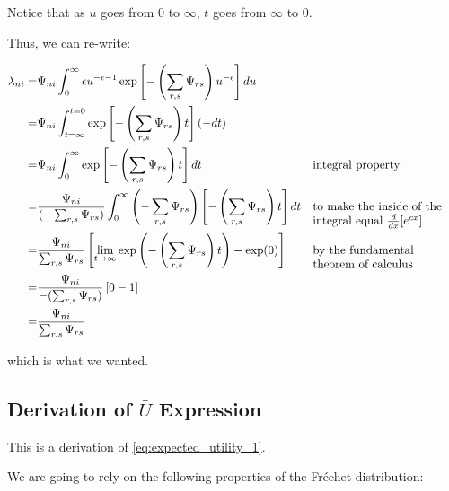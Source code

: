 \documentclass[10pt]{article}
\begin{document}
Notice that as $u$ goes from 0 to $\infty$, $t$ goes from $\infty$ to 0.

Thus, we can re-write:

\begin{align}
    \lambda_{ni} = &\Psi_{n i} \int_0^{\infty} \epsilon u^{-\epsilon-1} \exp \left[-\left(\sum_{r, s} \Psi_{r s}\right) u^{-\epsilon}\right] d u \\
    = &\Psi_{n i} \int_{t=\infty}^{t=0} \exp \left[- \left(\sum_{r, s} \Psi_{r s}\right) t\right](-d t)  \\
    = & \Psi_{n i} \int_{0}^{\infty} \exp \left[- \left(\sum_{r, s} \Psi_{r s}\right) t\right] d t && \parbox[t]{4cm}{\raggedright integral property} \\
    = & \frac{\Psi_{n i}}{(-\sum_{r, s} \Psi_{r s})} \int_{0}^\infty \left(-\sum_{r, s} \Psi_{r s}\right) \left[-\left(\sum_{r, s} \Psi_{r s}\right) t\right] d t && \parbox[t]{4cm}{\raggedright to make the inside of the integral equal $\frac{d}{dx}[e^{cx}]$} \\
    = & \frac{\Psi_{n i}}{\sum_{r, s} \Psi_{r s}} \left[ \lim_{t \to \infty} \exp\left(-\left(\sum_{r, s} \Psi_{r s}\right) t\right) - \exp(0)\right] && \parbox[t]{4cm}{\raggedright by the fundamental theorem of calculus} \\
    = & \frac{\Psi_{n i}}{-(\sum_{r, s} \Psi_{r s})} \left[0 - 1\right] \\
    = & \frac{\Psi_{n i}}{\sum_{r, s} \Psi_{r s}}
\end{align}

which is what we wanted.


\subsection{Derivation of $\bar{U}$ Expression}
\label{sec:expected_utility_1}

This is a derivation of \eqref{eq:expected_utility_1}.

We are going to rely on the following properties of 
the Fréchet distribution:
\end{document}
